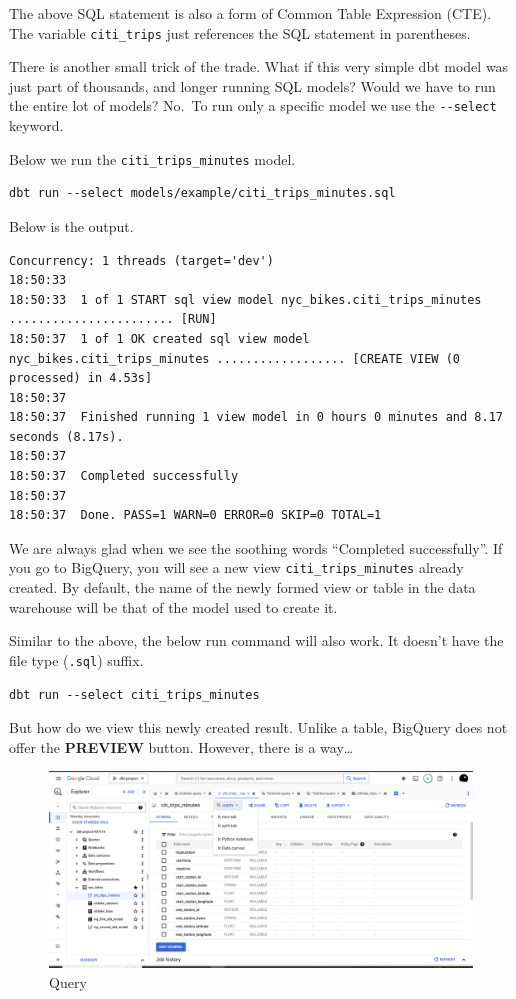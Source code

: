 \documentclass[
]{book}
\begin{document}
The above SQL statement is also a form of Common Table Expression (CTE). The variable \texttt{citi\_trips} just references the SQL statement in parentheses.

There is another small trick of the trade. What if this very simple dbt model was just part of thousands, and longer running SQL models? Would we have to run the entire lot of models? No.~To run only a specific model we use the \texttt{-\/-select} keyword.

Below we run the \texttt{citi\_trips\_minutes} model.

\begin{verbatim}
dbt run --select models/example/citi_trips_minutes.sql
\end{verbatim}

Below is the output.

\begin{verbatim}
Concurrency: 1 threads (target='dev')
18:50:33  
18:50:33  1 of 1 START sql view model nyc_bikes.citi_trips_minutes ....................... [RUN]
18:50:37  1 of 1 OK created sql view model nyc_bikes.citi_trips_minutes .................. [CREATE VIEW (0 processed) in 4.53s]
18:50:37  
18:50:37  Finished running 1 view model in 0 hours 0 minutes and 8.17 seconds (8.17s).
18:50:37  
18:50:37  Completed successfully
18:50:37  
18:50:37  Done. PASS=1 WARN=0 ERROR=0 SKIP=0 TOTAL=1
\end{verbatim}

We are always glad when we see the soothing words ``Completed successfully''. If you go to BigQuery, you will see a new view \texttt{citi\_trips\_minutes} already created. By default, the name of the newly formed view or table in the data warehouse will be that of the model used to create it.

Similar to the above, the below run command will also work. It doesn't have the file type (\texttt{.sql}) suffix.

\begin{verbatim}
dbt run --select citi_trips_minutes
\end{verbatim}

But how do we view this newly created result. Unlike a table, BigQuery does not offer the \textbf{PREVIEW} button. However, there is a way\ldots{}

\begin{figure}
\centering
\includegraphics{./images/query_button.png}
\caption{Query}
\end{figure}
\end{document}
